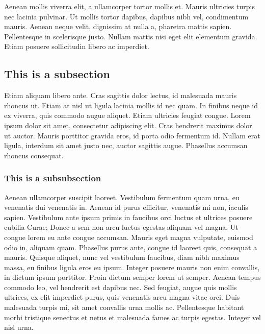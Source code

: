 Aenean mollis viverra elit, a ullamcorper tortor mollis et. Mauris ultricies turpis nec lacinia pulvinar. Ut mollis tortor dapibus, dapibus nibh vel, condimentum mauris. Aenean neque velit, dignissim at nulla a, pharetra mattis sapien. Pellentesque in scelerisque justo. Nullam mattis nisi eget elit elementum gravida. Etiam posuere sollicitudin libero ac imperdiet.

\subsection{This is a subsection}
Etiam aliquam libero ante. Cras sagittis dolor lectus, id malesuada mauris rhoncus ut. Etiam at nisl ut ligula lacinia mollis id nec quam. In finibus neque id ex viverra, quis commodo augue aliquet. Etiam ultricies feugiat congue. Lorem ipsum dolor sit amet, consectetur adipiscing elit. Cras hendrerit maximus dolor ut auctor. Mauris porttitor gravida eros, id porta odio fermentum id. Nullam erat ligula, interdum sit amet justo nec, auctor sagittis augue. Phasellus accumsan rhoncus consequat.

\subsubsection{This is a subsubsection}
Aenean ullamcorper suscipit laoreet. Vestibulum fermentum quam urna, eu venenatis dui venenatis in. Aenean id purus efficitur, venenatis mi non, iaculis sapien. Vestibulum ante ipsum primis in faucibus orci luctus et ultrices posuere cubilia Curae; Donec a sem non arcu luctus egestas aliquam vel magna. Ut congue lorem eu ante congue accumsan. Mauris eget magna vulputate, euismod odio in, aliquam quam. Phasellus purus ante, congue id laoreet quis, consequat a mauris. Quisque aliquet, nunc vel vestibulum faucibus, diam nibh maximus massa, eu finibus ligula eros eu ipsum. Integer posuere mauris non enim convallis, in dictum ipsum porttitor. Proin dictum semper lorem ut semper. Aenean tempus commodo leo, vel hendrerit est dapibus nec. Sed feugiat, augue quis mollis ultrices, ex elit imperdiet purus, quis venenatis arcu magna vitae orci. Duis malesuada turpis mi, sit amet convallis urna mollis ac. Pellentesque habitant morbi tristique senectus et netus et malesuada fames ac turpis egestas. Integer vel nisl urna.

